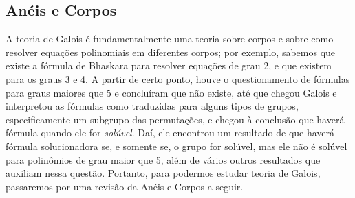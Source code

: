 \documentclass[../algebraIII_notes.tex]{subfiles}
\begin{document}
\subsection{Anéis e Corpos}
A teoria de Galois é fundamentalmente uma teoria sobre corpos e sobre como resolver equações polinomiais em diferentes corpos; por exemplo, sabemos que existe a fórmula de Bhaskara para resolver equações de grau 2, e que existem para os graus 3 e 4.
A partir de certo ponto, houve o questionamento de fórmulas para graus maiores que 5 e concluíram que não existe, até que chegou Galois e interpretou as fórmulas como traduzidas para alguns tipos de grupos, especificamente um subgrupo das permutações, e chegou à conclusão que haverá fórmula quando ele for \textit{solúvel}.
Daí, ele encontrou um resultado de que haverá fórmula solucionadora se, e somente se, o grupo for solúvel, mas ele não é solúvel para polinômios de grau maior que 5, além de vários outros resultados que auxiliam nessa questão.
Portanto, para podermos estudar teoria de Galois, passaremos por uma revisão da Anéis e Corpos a seguir.
\end{document}
